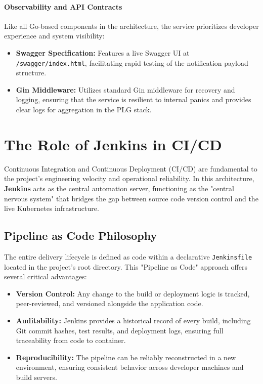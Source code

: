 \documentclass[12pt,a4paper]{report}
\begin{document}
\subsubsection{Observability and API Contracts}
Like all Go-based components in the architecture, the service prioritizes developer experience and system visibility:
\begin{itemize}
    \item \textbf{Swagger Specification:} Features a live Swagger UI at \texttt{/swagger/index.html}, facilitating rapid testing of the notification payload structure.
    \item \textbf{Gin Middleware:} Utilizes standard Gin middleware for recovery and logging, ensuring that the service is resilient to internal panics and provides clear logs for aggregation in the PLG stack.
\end{itemize}



\chapter{The Role of Jenkins in CI/CD}
Continuous Integration and Continuous Deployment (CI/CD) are fundamental to the project's engineering velocity and operational reliability. In this architecture, \textbf{Jenkins} acts as the central automation server, functioning as the "central nervous system" that bridges the gap between source code version control and the live Kubernetes infrastructure.

\section{Pipeline as Code Philosophy}
The entire delivery lifecycle is defined as code within a declarative \texttt{Jenkinsfile} located in the project's root directory. This "Pipeline as Code" approach offers several critical advantages:
\begin{itemize}
    \item \textbf{Version Control:} Any change to the build or deployment logic is tracked, peer-reviewed, and versioned alongside the application code.
    \item \textbf{Auditability:} Jenkins provides a historical record of every build, including Git commit hashes, test results, and deployment logs, ensuring full traceability from code to container.
    \item \textbf{Reproducibility:} The pipeline can be reliably reconstructed in a new environment, ensuring consistent behavior across developer machines and build servers.
\end{itemize}
\end{document}
